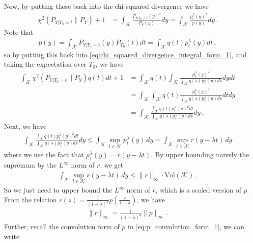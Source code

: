 \documentclass{article}
\theoremstyle{plain}
\theoremstyle{definition}
\theoremstyle{plain}
\newcommand{\cK}{\mathcal K}
\begin{document}
Now, by putting these back into the chi-squared divergence we have
\begin{align}
    \chi^2(P_{Y|T_0=t} \| P_{Y}) + 1
     & = \int_{\cK} \frac{P_{Y|T_0=t}(y)^2}{P_{Y}(y)} dy
    = \int_{\cK} \frac{p_t^\lambda(y)^2}{p(y)} dy\,.
    \label{eq:chi_squared_divergence_integral_form_1}
\end{align}
Note that
\begin{align}
    p(y) = \int_{\cK} P_{Y|T_0=t}(y) P_{T_0}(t) dt
    = \int_{\cK} q(t) p_t^\lambda(y) dt\,,
    \label{eq:p_convolution_form_1}
\end{align}
so by putting this back into \eqref{eq:chi_squared_divergence_integral_form_1}, and taking the expectation over $T_0$, we have
\begin{align}
    \int_\cK \chi^2(P_{Y|T_0=t} \| P_{Y}) q(t) dt + 1
     & = \int_{\cK} q(t) \int_{\cK} \frac{p_t^\lambda(y)^2}{\int_{\cK} q(s) p_s^\lambda(y) ds} dy dt   \\
     & = \int_{\cK} \int_{\cK}q(t) \frac{p_t^\lambda(y)^2}{\int_{\cK} q(s) p_s^\lambda(y) ds} dt dy    \\
     & = \int_{\cK} \frac{\int_{\cK}q(t) p_t^\lambda(y)^2 dt}{\int_{\cK} q(s) p_s^\lambda(y) ds} dy\,.
    \label{eq:chi_squared_divergence_integral_form_2}
\end{align}
Next, we have
\begin{align}
    \int_{\cK} \frac{\int_{\cK}q(t) p_t^\lambda(y)^2 dt}{\int_{\cK} q(s) p_s^\lambda(y) ds} dy
    \leq
    \int_{\cK} \sup_{t\in\cK} p_t^\lambda(y)\,dy
    =
    \int_{\cK} \sup_{t\in\cK} r(y - \lambda t)\,dy
\end{align}
where we use the fact that $p_t^\lambda(y) = r(y - \lambda t)$.
By upper bounding naively the supremum by the \(L^\infty\) norm of \(r\), we get
\begin{align}
    \int_{\cK} \sup_{t\in\cK} r(y - \lambda t)\,dy
    \le \|r\|_{\infty} \cdot \mathrm{Vol}(\cK)\,.
\end{align}
So we just need to upper bound the \(L^\infty\) norm of \(r\), which is a scaled version of \(p\).
From the relation $r(z) = \frac{1}{(1-\lambda)^d} p\left(\frac{z}{1-\lambda}\right)$, we have
\begin{align}
    \|r\|_{\infty} = \frac{1}{(1-\lambda)^d} \|p\|_{\infty}\,.
\end{align}
Further, recall the convolution form of $p$ in \eqref{eq:p_convolution_form_1}, we can write
\end{document}
